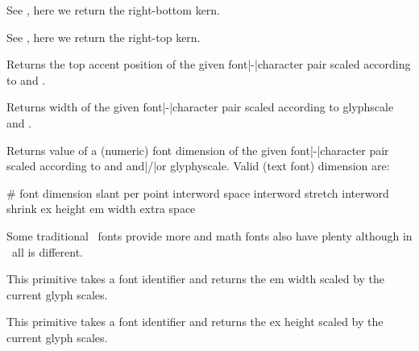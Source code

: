 \startnewprimitive[title={\prm {scaledfontcharrb}}]

See , here we return the right-bottom kern.

\stopnewprimitive

\startnewprimitive[title={\prm {scaledfontcharrt}}]

See , here we return the right-top kern.

\stopnewprimitive

\startnewprimitive[title={\prm {scaledfontcharta}}]

Returns the top accent position of the given font|-|character pair scaled
according to  and .

\stopnewprimitive

\startnewprimitive[title={\prm {scaledfontcharwd}}]

Returns width of the given font|-|character pair scaled according to \prm
{glyphscale} and .

\stopnewprimitive

\startnewprimitive[title={\prm {scaledfontdimen}}]

Returns value of a (numeric) font dimension of the given font|-|character pair
scaled according to  and  and|/|or \prm
{glyphyscale}. Valid (text font) dimension are:

\starttabulate[|c|l|]
\BC \# \BC font dimension    \NC \NR
{}  \NC slant per point   \NC \NR
{}  \NC interword space   \NC \NR
{}  \NC interword stretch \NC \NR
{}  \NC interword shrink  \NC \NR
{}  \NC ex height         \NC \NR
{}  \NC em width          \NC \NR
{}  \NC extra space       \NC \NR
\stoptabulate

Some traditional \TEX\ fonts provide more and math fonts also have
plenty although in \OPENTYPE\ all is different.

\stopnewprimitive

\startnewprimitive[title={\prm {scaledfontemwidth}}]

This primitive takes a font identifier and returns the em width
scaled by the current glyph scales.

\stopnewprimitive

\startnewprimitive[title={\prm {scaledfontexheight}}]

This primitive takes a font identifier and returns the ex height
scaled by the current glyph scales.

\stopnewprimitive

